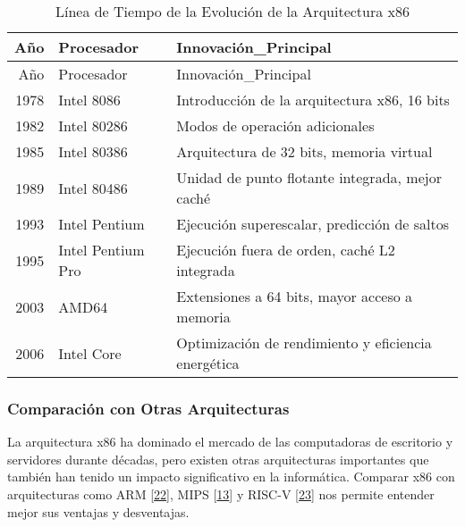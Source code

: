 \documentclass[12pt,twoside]{templates/unerthesis}
\begin{document}
\begin{longtable}[]{@{}rll@{}}
\caption{\label{tab:tabla-evolucion-x86}Línea de Tiempo de la Evolución de la Arquitectura x86}\tabularnewline
\toprule
Año & Procesador & Innovación\_Principal\tabularnewline
\midrule
\endfirsthead
\toprule
Año & Procesador & Innovación\_Principal\tabularnewline
\midrule
\endhead
1978 & Intel 8086 & Introducción de la arquitectura x86, 16 bits\tabularnewline
1982 & Intel 80286 & Modos de operación adicionales\tabularnewline
1985 & Intel 80386 & Arquitectura de 32 bits, memoria virtual\tabularnewline
1989 & Intel 80486 & Unidad de punto flotante integrada, mejor caché\tabularnewline
1993 & Intel Pentium & Ejecución superescalar, predicción de saltos\tabularnewline
1995 & Intel Pentium Pro & Ejecución fuera de orden, caché L2 integrada\tabularnewline
2003 & AMD64 & Extensiones a 64 bits, mayor acceso a memoria\tabularnewline
2006 & Intel Core & Optimización de rendimiento y eficiencia energética\tabularnewline
\bottomrule
\end{longtable}

\hypertarget{comparaciuxf3n-con-otras-arquitecturas}{%
\subsubsection{Comparación con Otras Arquitecturas}\label{comparaciuxf3n-con-otras-arquitecturas}}

La arquitectura x86 ha dominado el mercado de las computadoras de escritorio y servidores durante décadas, pero existen otras arquitecturas importantes que también han tenido un impacto significativo en la informática. Comparar x86 con arquitecturas como ARM {[}\protect\hyperlink{ref-patterson2016computer}{22}{]}, MIPS {[}\protect\hyperlink{ref-hennessy_computer_2012}{13}{]} y RISC-V {[}\protect\hyperlink{ref-waterman2014risc}{23}{]} nos permite entender mejor sus ventajas y desventajas.
\end{document}

